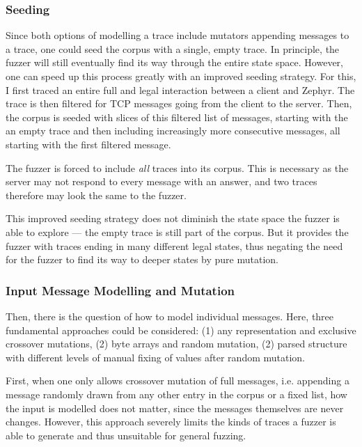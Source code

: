 \documentclass{article}
\begin{document}
\begin{multicols}{2}
  \subsubsection{Seeding}
  \label{Implementation:Seeding}

  Since both options of modelling a trace include mutators appending messages to a trace, one could seed the corpus with a single, empty trace. In principle, the fuzzer will still eventually find its way through the entire state space. However, one can speed up this process greatly with an improved seeding strategy. For this, I first traced an entire full and legal interaction between a client and Zephyr. The trace is then filtered for TCP messages going from the client to the server. Then, the corpus is seeded with slices of this filtered list of messages, starting with the an empty trace and then including increasingly more consecutive messages, all starting with the first filtered message.

  The fuzzer is forced to include \textit{all} traces into its corpus. This is necessary as the server may not respond to every message with an answer, and two traces therefore may look the same to the fuzzer.

  This improved seeding strategy does not diminish the state space the fuzzer is able to explore — the empty trace is still part of the corpus. But it provides the fuzzer with traces ending in many different legal states, thus negating the need for the fuzzer to find its way to deeper states by pure mutation.

  \subsubsection{Input Message Modelling and Mutation}
  Then, there is the question of how to model individual messages. Here, three fundamental approaches could be considered: (1) any representation and exclusive crossover mutations, (2) byte arrays and random mutation, (2) parsed structure with different levels of manual fixing of values after random mutation.

  First, when one only allows crossover mutation of full messages, i.e. appending a message randomly drawn from any other entry in the corpus or a fixed list, how the input is modelled does not matter, since the messages themselves are never changes. However, this approach severely limits the kinds of traces a fuzzer is able to generate and thus unsuitable for general fuzzing.


\end{multicols}
\end{document}
